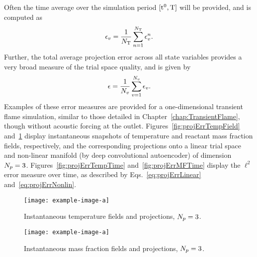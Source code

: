 Often the time average over the simulation period $[\text{t}^0, \text{T}]$ will be provided, and is computed as
%
\begin{equation}
    \epsilon_{v} = \frac{1}{N_{\text{T}}} \sum_{n = 1}^{N_{\text{T}}} \epsilon_{v}^{n}.
\end{equation}
%
Further, the total average projection error across all state variables provides a very broad measure of the trial space quality, and is given by
%
\begin{equation}
    \epsilon = \frac{1}{N_{v}} \sum_{v = 1}^{N_{v}} \epsilon_{v}.
\end{equation}
%
Examples of these error measures are provided for a one-dimensional transient flame simulation, similar to those detailed in Chapter~\ref{chap:TransientFlame}, though without acoustic forcing at the outlet. Figures~\ref{fig:projErrTempField} and~\ref{fig:projErrMFField} display instantaneous snapshots of temperature and reactant mass fraction fields, respectively, and the corresponding projections onto a linear trial space and non-linear manifold (by deep convolutional autoencoder) of dimension $N_p = 3$. Figures~\ref{fig:projErrTempTime} and~\ref{fig:projErrMFTime} display the $\ell^2$ error measure over time, as described by Eqs.~\ref{eq:projErrLinear} and~\ref{eq:projErrNonlin}.
%
\begin{figure}
    \begin{minipage}{0.45\linewidth}
        \texttt{[image: example-image-a]}
        \caption{\label{fig:projErrTempField}Instantaneous temperature fields and projections, $N_p = 3$.}
    \end{minipage}
    \hspace{1em}
    \begin{minipage}{0.45\linewidth}
        \texttt{[image: example-image-a]}
        \caption{\label{fig:projErrMFField}Instantaneous mass fraction fields and projections, $N_p = 3$.}
    \end{minipage}
\end{figure}
%
